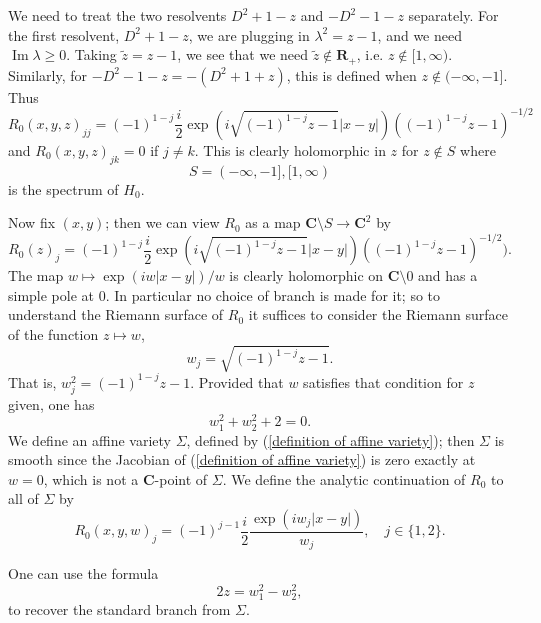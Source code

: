 \documentclass[reqno,12pt,letterpaper]{amsart}
\newcommand{\RR}{\mathbf{R}}
\newcommand{\CC}{\mathbf{C}}
\renewcommand{\Im}{\operatorname{Im}}
\theoremstyle{definition}
\begin{document}
We need to treat the two resolvents $D^2 + 1 - z$ and $-D^2 - 1 - z$ separately.
For the first resolvent, $D^2 + 1 - z$, we are plugging in $\lambda^2 = z - 1$, and we need $\Im \lambda \geq 0$.
Taking $\widetilde z = z - 1$, we see that we need $\widetilde z \notin \RR_+$, i.e. $z \notin [1, \infty)$.
Similarly, for $-D^2 - 1 - z = -(D^2 + 1 + z)$, this is defined when $z \notin (-\infty, -1]$. Thus
$$R_0(x, y, z)_{jj} = (-1)^{1-j}\frac{i}{2} \exp(i\sqrt{(-1)^{1-j}z -1}|x-y|)((-1)^{1-j}z -1)^{-1/2}$$
and $R_0(x,y,z)_{jk} = 0$ if $j \neq k$.
This is clearly holomorphic in $z$ for $z \notin S$ where
$$S = (-\infty, -1], [1, \infty)$$
is the spectrum of $H_0$.

Now fix $(x, y)$; then we can view $R_0$ as a map $\CC \setminus S \to \CC^2$ by
$$R_0(z)_j = (-1)^{1-j} \frac{i}{2} \exp(i\sqrt{(-1)^{1-j}z -1}|x-y|)((-1)^{1-j}z -1)^{-1/2}).$$
The map $w \mapsto \exp(iw|x-y|)/w$ is clearly holomorphic on $\CC \setminus 0$ and has a simple pole at $0$.
In particular no choice of branch is made for it; so to understand the Riemann surface of $R_0$ it suffices to consider the Riemann surface of the function $z \mapsto w$,
$$w_j = \sqrt{(-1)^{1-j}z-1}.$$
That is, $w_j^2 = (-1)^{1-j}z - 1$. Provided that $w$ satisfies that condition for $z$ given, one has
\begin{equation}
\label{definition of affine variety}
w_1^2 + w_2^2 + 2 = 0.
\end{equation}
We define an affine variety $\Sigma$, defined by (\ref{definition of affine variety}); then $\Sigma$ is smooth since the Jacobian of (\ref{definition of affine variety}) is zero exactly at $w = 0$, which is not a $\CC$-point of $\Sigma$.
We define the analytic continuation of $R_0$ to all of $\Sigma$ by
\begin{equation}
\label{free analytic continuation}
R_0(x, y, w)_j = (-1)^{j-1} \frac{i}{2} \frac{\exp(iw_j|x-y|)}{w_j},\quad j \in \{1, 2\}.
\end{equation}

One can use the formula
\begin{equation}
\label{recovering the standard branch}
2z = w_1^2 - w_2^2,
\end{equation}
to recover the standard branch from $\Sigma$.
\end{document}
